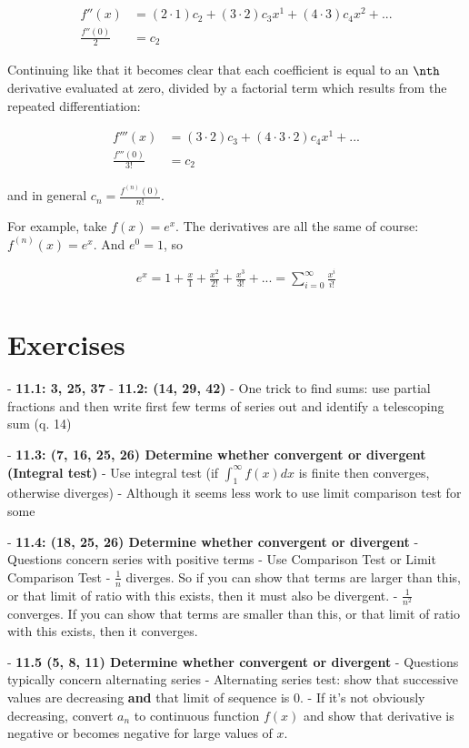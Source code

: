 \begin{align*}
  f''(x) &= (2\cdot 1)c_2 + (3\cdot 2)c_3x^1 + (4\cdot 3)c_4x^2 + ... \\
  \frac{f''(0)}{2} &= c_2
\end{align*}

Continuing like that it becomes clear that each coefficient is equal to an $\nth$ derivative evaluated at zero, divided by a factorial term which results from the repeated differentiation:

\begin{align*}
  f'''(x) &= (3\cdot2)c_3 + (4\cdot3\cdot2)c_4x^1 + ... \\
  \frac{f'''(0)}{3!} &= c_2
\end{align*}

and in general $c_n = \frac{f^{(n)}(0)}{n!}$.

For example, take $f(x) = e^x$. The derivatives are all the same of course: $f^{(n)}(x) = e^x$. And $e^0 = 1$, so

\begin{align*}
  e^x = 1 + \frac{x}{1} + \frac{x^2}{2!} + \frac{x^3}{3!} + ... = \sum_{i=0}^\infty \frac{x^i}{i!}
\end{align*}

\section{Exercises}

- \textbf{11.1: 3, 25, 37}
- \textbf{11.2: (14, 29, 42)}
- One trick to find sums: use partial fractions and then write first few terms of series out and identify a telescoping sum (q. 14)

- \textbf{11.3: (7, 16, 25, 26) Determine whether convergent or divergent (Integral test)}
- Use integral test (if $\int_1^\infty f(x) dx$ is finite then converges, otherwise diverges)
- Although it seems less work to use limit comparison test for some

- \textbf{11.4: (18, 25, 26) Determine whether convergent or divergent}
- Questions concern series with positive terms
- Use Comparison Test or Limit Comparison Test
- $\frac{1}{n}$ diverges. So if you can show that terms are larger than this, or that limit of ratio with this exists, then it must also be divergent.
- $\frac{1}{n^2}$ converges. If you can show that terms are smaller than this, or that limit of ratio with this exists, then it converges.

- \textbf{11.5 (5, 8, 11) Determine whether convergent or divergent}
- Questions typically concern alternating series
- Alternating series test: show that successive values are decreasing \textbf{and} that limit of sequence is 0.
- If it's not obviously decreasing, convert $a_n$ to continuous function $f(x)$ and show that derivative is negative or becomes negative for large values of $x$.

